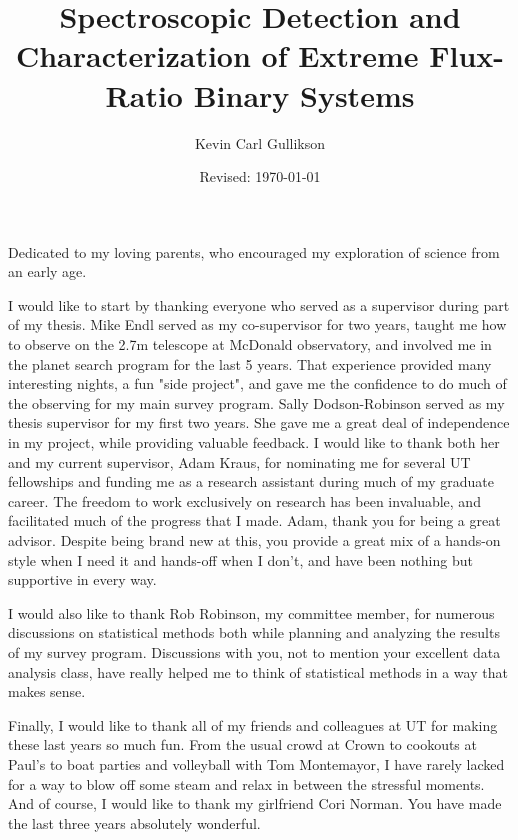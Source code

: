 \documentclass{utthesis}
\begin{document}
\author{Kevin Carl Gullikson}
\title{Spectroscopic Detection and Characterization of Extreme Flux-Ratio Binary Systems}
\date{Revised: \today}

\UTcopyrightlegend %

\begin{UTcommittee}
\end{UTcommittee}


\frontmatter


\begin{UTdedication}
Dedicated to my loving parents, who encouraged my exploration of science from an early age.
\end{UTdedication}

\cleardoublepage
\setcounter{page}{5}

\begin{UTacknowledgements}
I would like to start by thanking everyone who served as a supervisor during part of my thesis. Mike Endl served as my co-supervisor for two years, taught me how to observe on the 2.7m telescope at McDonald observatory, and involved me in the planet search program for the last 5 years. That experience provided many interesting nights, a fun "side project", and gave me the confidence to do much of the observing for my main survey program. Sally Dodson-Robinson served as my thesis supervisor for my first two years. She gave me a great deal of independence in my project, while providing valuable feedback. I would like to thank both her and my current supervisor, Adam Kraus, for nominating me for several UT fellowships and funding me as a research assistant during much of my graduate career. The freedom to work exclusively on research has been invaluable, and facilitated much of the progress that I made. Adam, thank you for being a great advisor. Despite being brand new at this, you provide a great mix of a hands-on style when I need it and hands-off when I don't, and have been nothing but supportive in every way. 

I would also like to thank Rob Robinson, my committee member, for numerous discussions on statistical methods both while planning and analyzing the results of my survey program. Discussions with you, not to mention your excellent data analysis class, have really helped me to think of statistical methods in a way that makes sense.

Finally, I would like to thank all of my friends and colleagues at UT for making these last years so much fun. From the usual crowd at Crown to cookouts at Paul's to boat parties and volleyball with Tom Montemayor, I have rarely lacked for a way to blow off some steam and relax in between the stressful moments. And of course, I would like to thank my girlfriend Cori Norman. You have made the last three years absolutely wonderful.

\end{UTacknowledgements}
\end{document}
